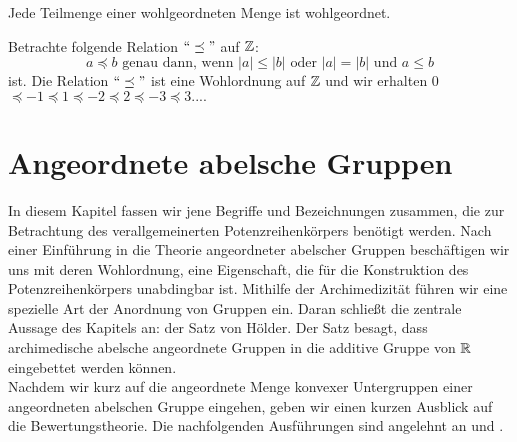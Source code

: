 %

%
%
\begin{bem}\label{Teilmengewohlgeordnet}
Jede Teilmenge einer wohlgeordneten Menge ist wohlgeordnet.
\end{bem}
\begin{bsp}
Betrachte folgende Relation $``\preceq " $ auf $\mathbb{Z}$:  
\[a \preceq b \text{ genau dann, wenn } |a| \le |b| \text{ oder }  |a| = |b| \text{ und } a \leq  b\]
ist.
Die Relation $``\preceq "$ ist eine Wohlordnung auf $\mathbb{Z}$ und wir erhalten 0$  \preceq -1 \preceq 1 \preceq -2 \preceq 2 \preceq -3 \preceq 3 .... $ 
\end{bsp}
%

%
 
\chapter{Angeordnete abelsche Gruppen}\label{chap2} %
In diesem Kapitel fassen wir jene Begriffe und Bezeichnungen zusammen, die zur Betrachtung des verallgemeinerten Potenzreihenkörpers benötigt werden. Nach einer Einführung in die Theorie angeordneter abelscher Gruppen beschäftigen wir uns mit deren Wohlordnung, eine Eigenschaft, die für die Konstruktion des Potenzreihenkörpers unabdingbar ist. Mithilfe der Archimedizität führen wir eine spezielle Art der Anordnung von Gruppen ein. Daran schließt die zentrale Aussage des Kapitels an: der Satz von Hölder. Der Satz besagt, dass archimedische abelsche angeordnete Gruppen in die additive Gruppe von $\mathbb{R}$ eingebettet werden können. \\
Nachdem wir kurz auf die angeordnete Menge konvexer Untergruppen einer angeordneten abelschen Gruppe eingehen, geben wir einen kurzen Ausblick auf die Bewertungstheorie.
Die nachfolgenden Ausführungen sind angelehnt an \cite[S. 21 - 28]{fuchs66} und \cite[S. 1 -  4]{priesscrampe83}.
%
%

